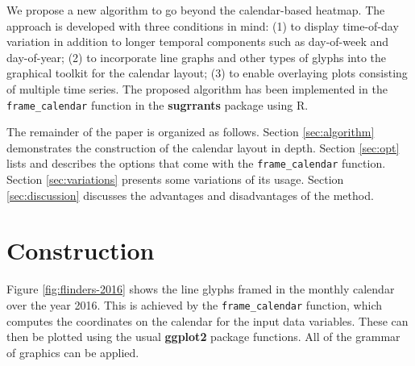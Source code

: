 \documentclass[12pt]{article}
\begin{document}
We propose a new algorithm to go beyond the calendar-based heatmap. The
approach is developed with three conditions in mind: (1) to display
time-of-day variation in addition to longer temporal components such as
day-of-week and day-of-year; (2) to incorporate line graphs and other
types of glyphs into the graphical toolkit for the calendar layout; (3)
to enable overlaying plots consisting of multiple time series. The
proposed algorithm has been implemented in the \texttt{frame\_calendar}
function in the \textbf{sugrrants} package using R.

The remainder of the paper is organized as follows. Section
\ref{sec:algorithm} demonstrates the construction of the calendar layout
in depth. Section \ref{sec:opt} lists and describes the options that
come with the \texttt{frame\_calendar} function. Section
\ref{sec:variations} presents some variations of its usage. Section
\ref{sec:discussion} discusses the advantages and disadvantages of the
method.

\hypertarget{construction}{%
\section{Construction}\label{construction}}

\label{sec:algorithm}

Figure \ref{fig:flinders-2016} shows the line glyphs framed in the
monthly calendar over the year 2016. This is achieved by the
\texttt{frame\_calendar} function, which computes the coordinates on the
calendar for the input data variables. These can then be plotted using
the usual \textbf{ggplot2} package \citep{R-ggplot2} functions. All of
the grammar of graphics \citep{wilkinson2006grammar, wickham2009ggplot2}
can be applied.
\end{document}
